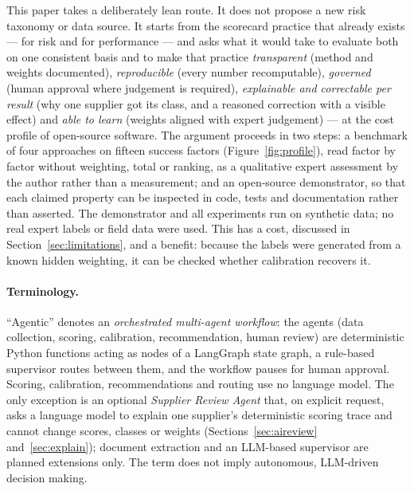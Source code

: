 \documentclass[10pt,twocolumn,a4paper]{article}
\begin{document}
This paper takes a deliberately lean route. It does not propose a new risk taxonomy or
data source. It starts from the scorecard practice that already exists --- for risk and
for performance --- and asks what it would take to evaluate both on one consistent basis
and to make that practice \emph{transparent} (method and weights documented),
\emph{reproducible} (every number recomputable), \emph{governed} (human approval where
judgement is required), \emph{explainable and correctable per result} (why one supplier got its
class, and a reasoned correction with a visible effect) and \emph{able to learn} (weights aligned with expert judgement)
--- at the cost profile of open-source software. The argument proceeds in two steps: a
benchmark of four approaches on fifteen success factors (Figure~\ref{fig:profile}), read
factor by factor without weighting, total or ranking, as a qualitative expert assessment
by the author rather than a measurement; and an open-source demonstrator, so that each
claimed property can be inspected in code, tests and documentation rather than asserted.
The demonstrator and all experiments run on synthetic data; no real expert labels or field
data were used. This has a cost, discussed in
Section~\ref{sec:limitations}, and a benefit: because the labels were generated from a
known hidden weighting, it can be checked whether calibration recovers it.

\paragraph{Terminology.} ``Agentic'' denotes an \emph{orchestrated multi-agent
workflow}: the agents (data collection, scoring, calibration, recommendation, human
review) are deterministic Python functions acting as nodes of a LangGraph state graph, a
rule-based supervisor routes between them, and the workflow pauses for human approval.
Scoring, calibration, recommendations and routing use no language model. The only
exception is an optional \emph{Supplier Review Agent} that, on explicit request, asks a
language model to explain one supplier's deterministic scoring trace and cannot change scores,
classes or weights (Sections~\ref{sec:aireview} and~\ref{sec:explain}); document extraction and an LLM-based supervisor
are planned extensions only. The term does not imply autonomous, LLM-driven decision
making.
\end{document}
